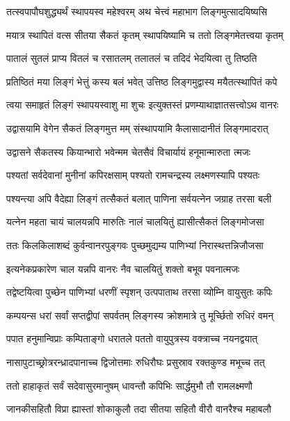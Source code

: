 \twolineshloka
{तत्स्वपापौघशुद्ध्यर्थं स्थापयस्व महेश्वरम्}
{अथ चेत्त्वं महाभाग लिङ्गमुत्सादयिष्यसि}%

\twolineshloka
{मयात्र स्थापितं वत्स सीतया सैकतं कृतम्}
{स्थापयिष्यामि च ततो लिङ्गमेतत्त्वया कृतम्}%

\twolineshloka
{पातालं सुतलं प्राप्य वितलं च रसातलम्}
{तलातलं च तदिदं भेदयित्वा तु तिष्ठति}%

\twolineshloka
{प्रतिष्ठितं मया लिङ्गं भेत्तुं कस्य बलं भवेत्}
{उत्तिष्ठ लिङ्गमुद्वास्य मयैतत्स्थापितं कपे}%

\twolineshloka
{त्वया समाहृतं लिङ्गं स्थापयस्वाशु मा शुचः}
{इत्युक्तस्तं प्रणम्याथाज्ञातसत्त्वोऽथ वानरः}%

\twolineshloka
{उद्वासयामि वेगेन सैकतं लिङ्गमुत्त मम्}
{संस्थापयामि कैलासादानीतं लिङ्गमादरात्}%

\twolineshloka
{उद्वासने सैकतस्य कियान्भारो भवेन्मम}
{चेतसैवं विचार्यायं हनूमान्मारुता त्मजः}%

\twolineshloka
{पश्यतां सर्वदेवानां मुनीनां कपिरक्षसाम्}
{पश्यतो रामचन्द्रस्य लक्ष्मणस्यापि पश्यतः}%

\twolineshloka
{पश्यन्त्या अपि वैदेह्या लिङ्गं तत्सैकतं बलात्}
{पाणिना सर्वयत्नेन जग्राह तरसा बली}%

\twolineshloka
{यत्नेन महता चायं चालयन्नपि मारुतिः}
{नालं चालयितुं ह्यासीत्सैकतं लिङ्गमोजसा}%

\twolineshloka
{ततः किलकिलाशब्दं कुर्वन्वानरपुङ्गवः}
{पुच्छमुद्यम्य पाणिभ्यां निरास्थत्तन्निजौजसा}%

\twolineshloka
{इत्यनेकप्रकारेण चाल यन्नपि वानरः}
{नैव चालयितुं शक्तो बभूव पवनात्मजः}%

\twolineshloka
{तद्वेष्टयित्वा पुच्छेन पाणिभ्यां धरणीं स्पृशन्}
{उत्पपाताथ तरसा व्योम्नि वायुसुतः कपिः}%

\twolineshloka
{कम्पयन्स धरां सर्वां सप्तद्वीपां सपर्वतम्}
{लिङ्गस्य क्रोशमात्रे तु मूर्च्छितो रुधिरं वमन्}%

\twolineshloka
{पपात हनुमान्विप्राः कम्पिताङ्गो धरातले}
{पततो वायुपुत्रस्य वक्त्राच्च नयनद्वयात्}%

\twolineshloka
{नासापुटाच्छ्रोत्ररन्ध्रादपानाच्च द्विजोत्तमाः}
{रुधिरौघः प्रसुस्राव रक्तकुण्ड मभूच्च तत्}%

\twolineshloka
{ततो हाहाकृतं सर्वं सदेवासुरमानुषम्}
{धावन्तौ कपिभिः सार्द्धमुभौ तौ रामलक्ष्मणौ}%

\twolineshloka
{जानकीसहितौ विप्रा ह्यास्तां शोकाकुलौ तदा}
{सीतया सहितौ वीरौ वानरैश्च महाबलौ}%

